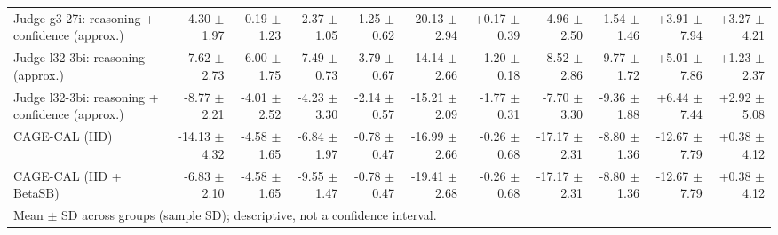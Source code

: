 \begin{tabular}{lrrrrrrrrrr}
Judge g3-27i: reasoning + confidence (approx.) & -4.30 {\scriptsize $\pm$ 1.97} & -0.19 {\scriptsize $\pm$ 1.23} & -2.37 {\scriptsize $\pm$ 1.05} & -1.25 {\scriptsize $\pm$ 0.62} & -20.13 {\scriptsize $\pm$ 2.94} & +0.17 {\scriptsize $\pm$ 0.39} & -4.96 {\scriptsize $\pm$ 2.50} & -1.54 {\scriptsize $\pm$ 1.46} & +3.91 {\scriptsize $\pm$ 7.94} & +3.27 {\scriptsize $\pm$ 4.21} \\
Judge l32-3bi: reasoning (approx.) & -7.62 {\scriptsize $\pm$ 2.73} & -6.00 {\scriptsize $\pm$ 1.75} & -7.49 {\scriptsize $\pm$ 0.73} & -3.79 {\scriptsize $\pm$ 0.67} & -14.14 {\scriptsize $\pm$ 2.66} & -1.20 {\scriptsize $\pm$ 0.18} & -8.52 {\scriptsize $\pm$ 2.86} & -9.77 {\scriptsize $\pm$ 1.72} & +5.01 {\scriptsize $\pm$ 7.86} & +1.23 {\scriptsize $\pm$ 2.37} \\
Judge l32-3bi: reasoning + confidence (approx.) & -8.77 {\scriptsize $\pm$ 2.21} & -4.01 {\scriptsize $\pm$ 2.52} & -4.23 {\scriptsize $\pm$ 3.30} & -2.14 {\scriptsize $\pm$ 0.57} & -15.21 {\scriptsize $\pm$ 2.09} & -1.77 {\scriptsize $\pm$ 0.31} & -7.70 {\scriptsize $\pm$ 3.30} & -9.36 {\scriptsize $\pm$ 1.88} & +6.44 {\scriptsize $\pm$ 7.44} & +2.92 {\scriptsize $\pm$ 5.08} \\
CAGE-CAL (IID) & -14.13 {\scriptsize $\pm$ 4.32} & -4.58 {\scriptsize $\pm$ 1.65} & -6.84 {\scriptsize $\pm$ 1.97} & -0.78 {\scriptsize $\pm$ 0.47} & -16.99 {\scriptsize $\pm$ 2.66} & -0.26 {\scriptsize $\pm$ 0.68} & -17.17 {\scriptsize $\pm$ 2.31} & -8.80 {\scriptsize $\pm$ 1.36} & -12.67 {\scriptsize $\pm$ 7.79} & +0.38 {\scriptsize $\pm$ 4.12} \\
CAGE-CAL (IID + BetaSB) & -6.83 {\scriptsize $\pm$ 2.10} & -4.58 {\scriptsize $\pm$ 1.65} & -9.55 {\scriptsize $\pm$ 1.47} & -0.78 {\scriptsize $\pm$ 0.47} & -19.41 {\scriptsize $\pm$ 2.68} & -0.26 {\scriptsize $\pm$ 0.68} & -17.17 {\scriptsize $\pm$ 2.31} & -8.80 {\scriptsize $\pm$ 1.36} & -12.67 {\scriptsize $\pm$ 7.79} & +0.38 {\scriptsize $\pm$ 4.12} \\
\bottomrule
\multicolumn{11}{l}{\scriptsize Mean $\pm$ SD across groups (sample SD); descriptive, not a confidence interval.} \\
\end{tabular}

